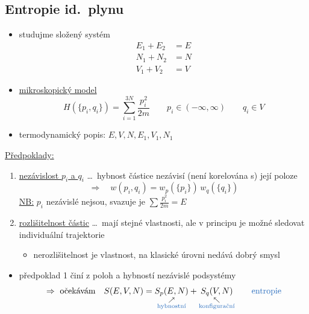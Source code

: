\subsection{Entropie id.\ plynu}
\begin{minipage}{0.45\textwidth}
\begin{itemize}
  \item studujme složený systém
  \begin{align*}
    E_1 + E_2 &= E \\
    N_1 + N_2 &= N \\
    V_1 + V_2 &= V
  \end{align*}
\end{itemize}
\end{minipage}
\begin{minipage}{0.53\textwidth}
\end{minipage}

\begin{itemize}
  \item \underline{mikroskopický model}
  \[
    H(\{p_i,q_i\}) = \sum_{i=1}^{3N}\frac{p_i^2}{2m} \qquad p_i\in(-\infty,\infty) \qquad q_i\in V
  \]
  \item termodynamický popis: \quad $E, V, N, E_1, V_1, N_1$
\end{itemize}

\underline{Předpoklady:}
\begin{enumerate}[label=\arabic*)]
  \item \underline{nezávislost $p_i$ a $q_i$} \dots\ hybnost částice nezávisí (není korelována s) její poloze
  \[ \Rightarrow\quad w(p_i,q_i) = w_p(\{p_i\})\,w_q(\{q_i\}) \]
  \underline{NB:} $p_i$ nezávislé nejsou, svazuje je $\sum\frac{p_i^2}{2m} = E$
  \item \underline{rozlišitelnost částic} \dots\ mají stejné vlastnosti, ale v principu je možné sledovat individuální trajektorie
  \begin{itemize}
    \item[--] nerozlišitelnost je  vlastnost, na klasické úrovni nedává dobrý smysl
  \end{itemize}
\end{enumerate}
\begin{itemize}
  \item předpoklad 1 činí z poloh a hybností nezávislé podsystémy
  \[
    \Rightarrow\ \text{očekávám}\quad
    S(E,V,N) = \underset{\substack{\nearrow\\ \textcolor{NavyBlue}{\text{hybnostní}}}}{S_p(E,N)} + \underset{\substack{\nwarrow\\ \textcolor{NavyBlue}{\text{konfigurační}}}}{S_q(V,N)}
    \qquad \textcolor{NavyBlue}{\text{entropie}}
  \]
\end{itemize}

